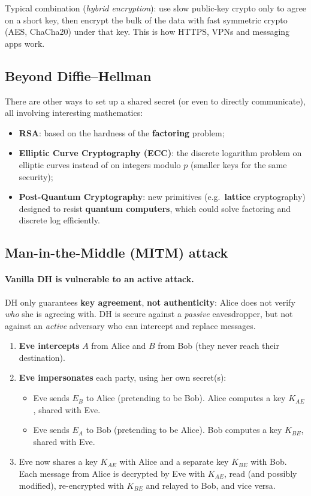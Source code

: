 \begin{remark}
Typical combination (\emph{hybrid encryption}): use slow public-key crypto only to agree on a short key, then encrypt the bulk of the data with fast symmetric crypto (AES, ChaCha20) under that key. This is how HTTPS, VPNs and messaging apps work.
\end{remark}

\subsection{Beyond Diffie--Hellman}

There are other ways to set up a shared secret (or even to directly communicate), all involving interesting mathematics:
\begin{itemize}
    \item \textbf{RSA}: based on the hardness of the \textbf{factoring} problem;
    \item \textbf{Elliptic Curve Cryptography (ECC)}: the discrete logarithm problem on elliptic curves instead of on integers modulo $p$ (smaller keys for the same security);
    \item \textbf{Post-Quantum Cryptography}: new primitives (e.g.\ \textbf{lattice} cryptography) designed to resist \textbf{quantum computers}, which could solve factoring and discrete log efficiently.
\end{itemize}

\subsection{Man-in-the-Middle (MITM) attack}

\paragraph{Vanilla DH is vulnerable to an active attack.} DH only guarantees \textbf{key agreement}, \textbf{not authenticity}: Alice does not verify \emph{who} she is agreeing with. DH is secure against a \emph{passive} eavesdropper, but not against an \emph{active} adversary who can intercept and replace messages.

\begin{enumerate}
    \item \textbf{Eve intercepts} $A$ from Alice and $B$ from Bob (they never reach their destination).
    \item \textbf{Eve impersonates} each party, using her own secret(s):
    \begin{itemize}
        \item Eve sends $E_B$ to Alice (pretending to be Bob). Alice computes a key $K_{AE}$, shared with Eve.
        \item Eve sends $E_A$ to Bob (pretending to be Alice). Bob computes a key $K_{BE}$, shared with Eve.
    \end{itemize}
    \item Eve now shares a key $K_{AE}$ with Alice and a separate key $K_{BE}$ with Bob. Each message from Alice is decrypted by Eve with $K_{AE}$, read (and possibly modified), re-encrypted with $K_{BE}$ and relayed to Bob, and vice versa.
\end{enumerate}

